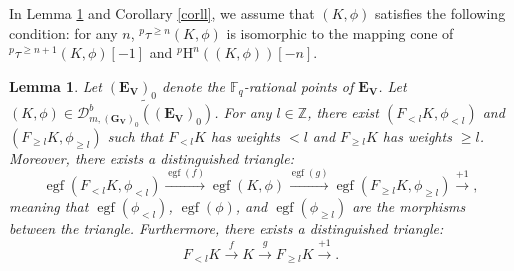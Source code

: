 \documentclass[10pt,a4paper]{amsart}
\newtheorem{lemma}[theorem]{Lemma}
\begin{document}
In Lemma \ref{leqq} and Corollary \ref{corll}, we assume that $(K,\phi)$ satisfies the following condition: for any $n$, ${}^p\tau^{\geq n}(K,\phi)$ is isomorphic to the mapping cone of ${}^p\tau^{\geq n+1}(K,\phi)[-1]$ and ${}^p\mathrm{H}^n((K,\phi))[-n]$.
\begin{lemma}\label{leqq}
Let $(\mathbf{E}_{\mathbf{V}})_0$ denote the $\mathbb{F}_q$-rational points of $\mathbf{E}_{\mathbf{V}}$. Let $(K,\phi) \in \widetilde{\mathcal{D}^{b}_{m,(\mathbf{G}_{\mathbf{V}})_0}((\mathbf{E}_{\mathbf{V}})_0)}$. For any $l \in \mathbb{Z}$, there exist $(F_{<l}K,\phi_{<l})$ and $(F_{\geq l}K,\phi_{\geq l})$ such that $F_{<l}K$ has weights $< l$ and $F_{\geq l}K$ has weights $\geq l$. Moreover, there exists a distinguished triangle:
\[
\operatorname{egf}(F_{<l}K,\phi_{<l}) \xrightarrow{\operatorname{egf}(f)} \operatorname{egf}(K,\phi) \xrightarrow{\operatorname{egf}(g)} \operatorname{egf}(F_{\geq l}K,\phi_{\geq l}) \xrightarrow{+1},
\]
meaning that $\operatorname{egf}(\phi_{<l})$, $\operatorname{egf}(\phi)$, and $\operatorname{egf}(\phi_{\geq l})$ are the morphisms between the triangle. Furthermore, there exists a distinguished triangle:
\[
F_{<l}K \xrightarrow{f} K \xrightarrow{g} F_{\geq l}K \xrightarrow{+1}.
\]
\end{lemma}
\end{document}
